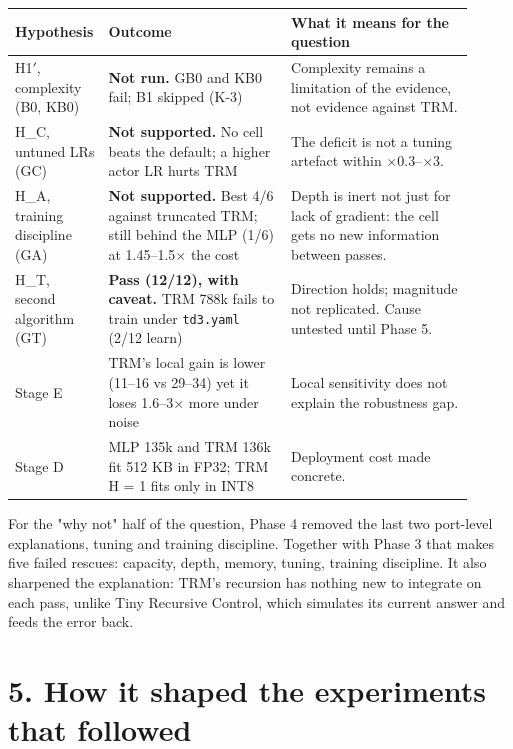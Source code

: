 \documentclass[11pt]{article}
\begin{document}
\begin{center}\small\begin{tabular}{>{\raggedright\arraybackslash}p{0.121\linewidth}>{\raggedright\arraybackslash}p{0.395\linewidth}>{\raggedright\arraybackslash}p{0.391\linewidth}}
\toprule
Hypothesis & Outcome & What it means for the question \\
\midrule
H1$'$, complexity (B0, KB0) & \textbf{Not run.} GB0 and KB0 fail; B1 skipped (K-3) & Complexity remains a limitation of the evidence, not evidence against TRM. \\
H\_C, untuned LRs (GC) & \textbf{Not supported.} No cell beats the default; a higher actor LR hurts TRM & The deficit is not a tuning artefact within $\times$0.3--$\times$3. \\
H\_A, training discipline (GA) & \textbf{Not supported.} Best 4/6 against truncated TRM; still behind the MLP (1/6) at 1.45--1.5$\times$ the cost & Depth is inert not just for lack of gradient: the cell gets no new information between passes. \\
H\_T, second algorithm (GT) & \textbf{Pass (12/12), with caveat.} TRM 788k fails to train under \texttt{td3.yaml} (2/12 learn) & Direction holds; magnitude not replicated. Cause untested until Phase 5. \\
Stage E & TRM's local gain is lower (11--16 vs 29--34) yet it loses 1.6--3$\times$ more under noise & Local sensitivity does not explain the robustness gap. \\
Stage D & MLP 135k and TRM 136k fit 512 KB in FP32; TRM H = 1 fits only in INT8 & Deployment cost made concrete. \\
\bottomrule
\end{tabular}\end{center}



For the "why not" half of the question, Phase 4 removed the last two port-level explanations, tuning and training discipline. Together with Phase 3 that makes five failed rescues: capacity, depth, memory, tuning, training discipline. It also sharpened the explanation: TRM's recursion has nothing new to integrate on each pass, unlike Tiny Recursive Control, which simulates its current answer and feeds the error back.



\section*{5. How it shaped the experiments that followed}
\end{document}
